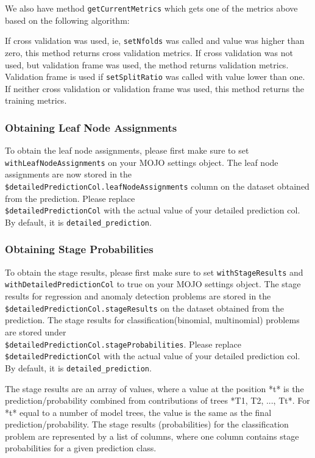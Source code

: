 We also have method \texttt{getCurrentMetrics} which gets one of the metrics above based on the following algorithm:

If cross validation was used, ie, \texttt{setNfolds} was called and value was higher than zero, this method returns cross validation
metrics. If cross validation was not used, but validation frame was used, the method returns validation metrics. Validation
frame is used if \texttt{setSplitRatio} was called with value lower than one. If neither cross validation or validation frame
was used, this method returns the training metrics.

\subsubsection{Obtaining Leaf Node Assignments}

To obtain the leaf node assignments, please first make sure to set\\ \texttt{withLeafNodeAssignments}
on your MOJO settings object. The leaf node assignments are now stored
in the \texttt{\${detailedPredictionCol}.leafNodeAssignments} column on the dataset obtained from the prediction.
Please replace\\ \texttt{\${detailedPredictionCol}} with the actual value of your detailed prediction col. By default,
it is \texttt{detailed\_prediction}.

\subsubsection{Obtaining Stage Probabilities}

To obtain the stage results, please first make sure to set \texttt{withStageResults} and
\texttt{withDetailedPredictionCol} to true on your MOJO settings object. The stage results for regression and
anomaly detection problems
are stored in the \texttt{\${detailedPredictionCol}.stageResults} on the dataset obtained from the prediction. The
stage results for classification(binomial, multinomial) problems are stored under \\
\texttt{\${detailedPredictionCol}.stageProbabilities}. Please replace \\ \texttt{\${detailedPredictionCol}}
with the actual value of your detailed prediction col. By default, it is \texttt{detailed\_prediction}.

The stage results are an array of values, where a value at the position *t* is the prediction/probability combined
from contributions of trees *T1, T2, ..., Tt*. For *t* equal to a number of model trees, the value is the same as the
final prediction/probability. The stage results (probabilities) for the classification problem
are represented by a list of columns, where one column contains stage probabilities for a given prediction class.

